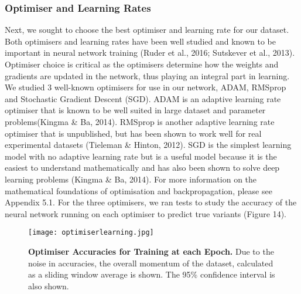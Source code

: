 \documentclass{article}
\begin{document}
\subsubsection{Optimiser and Learning Rates}
Next, we sought to choose the best optimiser and learning rate for our dataset. Both optimisers and learning rates have been well studied and known to be important in neural network training (Ruder et al., 2016; Sutskever et al., 2013). Optimiser choice is critical as the optimisers determine how the weights and gradients are updated in the network, thus playing an integral part in learning. We studied 3 well-known optimisers for use in our network, ADAM, RMSprop and Stochastic Gradient Descent (SGD). ADAM is an adaptive learning rate optimiser that is known to be well suited in large dataset and parameter problems(Kingma \& Ba, 2014). RMSprop is another adaptive learning rate optimiser that is unpublished, but has been shown to work well for real experimental datasets (Tieleman \& Hinton, 2012). SGD is the simplest learning model with no adaptive learning rate but is a useful model because it is the easiest to understand mathematically and has also been shown to solve deep learning problems (Kingma \& Ba, 2014). For more information on the mathematical foundations of optimisation and backpropagation, please see Appendix 5.1. For the three optimisers, we ran tests to study the accuracy of the neural network running on each optimiser to predict true variants (Figure 14).
\begin{figure}[H]
\texttt{[image: optimiserlearning.jpg]}
\centering
\caption{\textbf{Optimiser Accuracies for Training at each Epoch.} Due to the noise in accuracies, the overall momentum of the dataset, calculated as a sliding window average is shown. The 95\% confidence interval is also shown.}
\end{figure}
\end{document}
